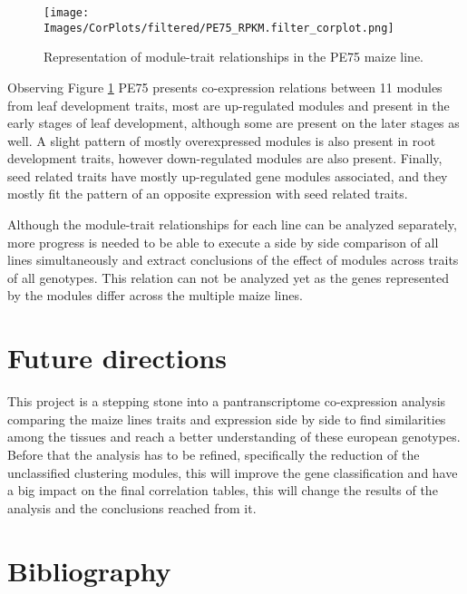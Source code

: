 \documentclass[
]{article}
\begin{document}
\begin{figure}[H]
  \centering
  \texttt{[image: Images/CorPlots/filtered/PE75\_RPKM.filter\_corplot.png]}
  \caption[PE75 Correlation Plot]{\small Representation of module-trait relationships in the PE75 maize line.}
    \label{fig:PE75_CorPlot}
\end{figure}

Observing Figure \ref{fig:PE75_CorPlot} PE75 presents co-expression relations between 11
modules from leaf development traits, most are up-regulated modules and
present in the early stages of leaf development, although some are
present on the later stages as well. A slight pattern of mostly
overexpressed modules is also present in root development traits,
however down-regulated modules are also present. Finally, seed related
traits have mostly up-regulated gene modules associated, and they mostly
fit the pattern of an opposite expression with seed related traits.

Although the module-trait relationships for each line can be analyzed
separately, more progress is needed to be able to execute a side by side
comparison of all lines simultaneously and extract conclusions of the
effect of modules across traits of all genotypes. This relation can not
be analyzed yet as the genes represented by the modules differ across
the multiple maize lines.

\hypertarget{future-directions}{%
\section{Future directions}\label{future-directions}}

This project is a stepping stone into a pantranscriptome co-expression
analysis comparing the maize lines traits and expression side by side to
find similarities among the tissues and reach a better understanding of
these european genotypes. Before that the analysis has to be refined,
specifically the reduction of the unclassified clustering modules, this
will improve the gene classification and have a big impact on the final
correlation tables, this will change the results of the analysis and the
conclusions reached from it.

\hypertarget{bibliography}{%
\section{Bibliography}\label{bibliography}}
\end{document}
